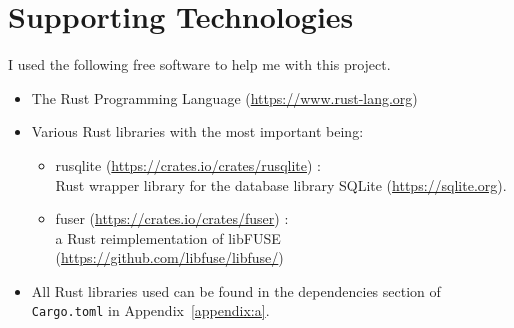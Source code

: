 \chapter*{Supporting Technologies}
\vspace{1cm}

\noindent
I used the following free software to help me with this project.
\begin{itemize}
    \item The Rust Programming Language (\url{https://www.rust-lang.org})
    \item[] Various Rust libraries with the most important being:
    \begin{itemize}
        \item rusqlite (\url{https://crates.io/crates/rusqlite}) : \\
            Rust wrapper library for the database library SQLite
            (\url{https://sqlite.org}).
        \item fuser (\url{https://crates.io/crates/fuser}) : \\
            a Rust reimplementation of
            libFUSE (\url{https://github.com/libfuse/libfuse/})
    \end{itemize}
    \item[] All Rust libraries used can be found in the dependencies section of
        \texttt{Cargo.toml} in Appendix~\ref{appendix:a}.
\end{itemize}
